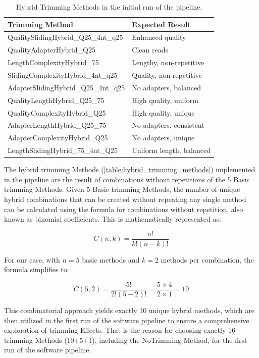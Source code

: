 \begin{table}[H]
\centering
\begin{tabular}{l l}
\hline
\textbf{Trimming Method} & \textbf{Expected Result} \\ \hline
QualitySlidingHybrid\_Q25\_4nt\_q25 & Enhanced quality \\
QualityAdapterHybrid\_Q25 & Clean reads \\
LengthComplexityHybrid\_75 & Lengthy, non-repetitive \\
SlidingComplexityHybrid\_4nt\_q25 & Quality, non-repetitive \\
AdapterSlidingHybrid\_Q25\_4nt\_q25 & No adapters, balanced \\
QualityLengthHybrid\_Q25\_75 & High quality, uniform \\
QualityComplexityHybrid\_Q25 & High quality, unique \\
AdapterLengthHybrid\_Q25\_75 & No adapters, consistent \\
AdapterComplexityHybrid\_Q25 & No adapters, unique \\
LengthSlidingHybrid\_75\_4nt\_Q25 & Uniform length, balanced \\
\hline
\end{tabular}
\caption{Hybrid Trimming Methods in the initial run of the pipeline.}
\label{table:hybrid_trimming_methods}
\end{table}

The hybrid \gls{trimming} Methods (\autoref{table:hybrid_trimming_methods}) implemented in the pipeline are the result of combinations without repetitions of the 5 Basic \gls{trimming} Methods. Given 5 Basic \gls{trimming} Methods, the number of unique hybrid combinations that can be created without repeating any single method can be calculated using the formula for combinations without repetition, also known as binomial coefficients. This is mathematically represented as:

\[
C(n, k) = \frac{n!}{k!(n-k)!}
\]

For our case, with \( n = 5 \) basic methods and \( k = 2 \) methods per combination, the formula simplifies to:

\[
C(5, 2) = \frac{5!}{2!(5-2)!} = \frac{5 \times 4}{2 \times 1} = 10
\]

This combinatorial approach yields exactly 10 unique hybrid methods, which are then utilized in the first run of the software pipeline to ensure a comprehensive exploration of \gls{trimming} Effects. That is the reason for choosing exactly 16 \gls{trimming} Methods (10+5+1), including the NoTrimming Method, for the first run of the software pipeline.

